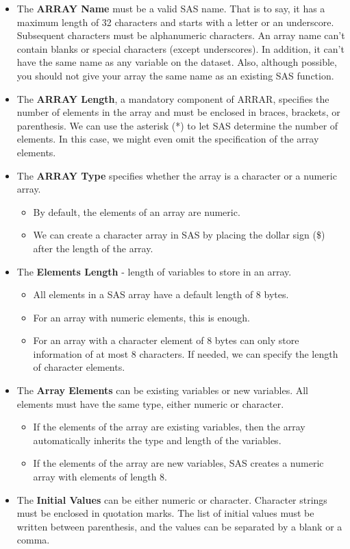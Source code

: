 \documentclass[
]{book}
\providecommand{\tightlist}{%
  \setlength{\itemsep}{0pt}\setlength{\parskip}{0pt}}
\begin{document}
\begin{itemize}
\item
  The \textbf{ARRAY Name} must be a valid SAS name. That is to say, it has a maximum length of 32 characters and starts with a letter or an underscore. Subsequent characters must be alphanumeric characters. An array name can't contain blanks or special characters (except underscores). In addition, it can't have the same name as any variable on the dataset. Also, although possible, you should not give your array the same name as an existing SAS function.
\item
  The \textbf{ARRAY Length}, a mandatory component of ARRAR, specifies the number of elements in the array and must be enclosed in braces, brackets, or parenthesis. We can use the asterisk (*) to let SAS determine the number of elements. In this case, we might even omit the specification of the array elements.
\item
  The \textbf{ARRAY Type} specifies whether the array is a character or a numeric array.

  \begin{itemize}
  \tightlist
  \item
    By default, the elements of an array are numeric.
  \item
    We can create a character array in SAS by placing the dollar sign (\$) after the length of the array.
  \end{itemize}
\item
  The \textbf{Elements Length} - length of variables to store in an array.

  \begin{itemize}
  \tightlist
  \item
    All elements in a SAS array have a default length of 8 bytes.
  \item
    For an array with numeric elements, this is enough.
  \item
    For an array with a character element of 8 bytes can only store information of at most 8 characters. If needed, we can specify the length of character elements.
  \end{itemize}
\item
  The \textbf{Array Elements} can be existing variables or new variables. All elements must have the same type, either numeric or character.

  \begin{itemize}
  \tightlist
  \item
    If the elements of the array are existing variables, then the array automatically inherits the type and length of the variables.
  \item
    If the elements of the array are new variables, SAS creates a numeric array with elements of length 8.
  \end{itemize}
\item
  The \textbf{Initial Values} can be either numeric or character. Character strings must be enclosed in quotation marks. The list of initial values must be written between parenthesis, and the values can be separated by a blank or a comma.
\end{itemize}
\end{document}
